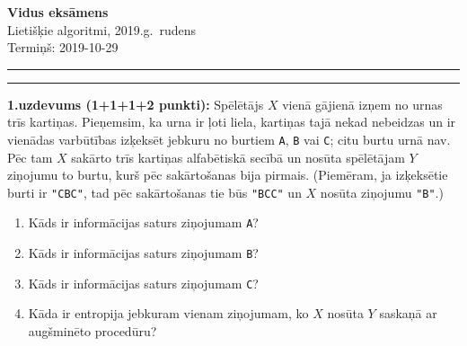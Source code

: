 \documentclass[a4paper,12pt]{article}
\begin{document}
\thispagestyle{empty}

\begin{center}
{\bf\Huge Vidus eksāmens} \\[5pt]
Lietišķie algoritmi, 2019.g.\ rudens\\
Termiņš: 2019-10-29
\end{center}

\hrule
\vspace{2pt}
\hrule
\vspace{12pt}





\noindent
{\bf 1.uzdevums (1+1+1+2 punkti):}
Spēlētājs $X$ vienā gājienā izņem no urnas trīs kartiņas. 
Pieņemsim, ka urna ir ļoti liela, kartiņas tajā nekad nebeidzas un ir vienādas varbūtības
izķeksēt jebkuru no burtiem {\tt A}, {\tt B} vai {\tt C}; citu burtu urnā nav.
Pēc tam $X$ sakārto trīs kartiņas alfabētiskā secībā un nosūta spēlētājam $Y$ ziņojumu \textendash{} to burtu, kurš 
pēc sakārtošanas bija pirmais. (Piemēram, ja izķeksētie burti ir {\tt "CBC"}, tad pēc sakārtošanas tie būs {\tt "BCC"} un 
$X$ nosūta ziņojumu {\tt "B"}.) 
\begin{enumerate}[label=(\alph*)]
\item Kāds ir informācijas saturs ziņojumam {\tt A}?
\item Kāds ir informācijas saturs ziņojumam {\tt B}? 
\item Kāds ir informācijas saturs ziņojumam {\tt C}? 
\item Kāda ir entropija jebkuram vienam ziņojumam, ko $X$ nosūta $Y$ saskaņā ar augšminēto procedūru?
\end{enumerate}
\end{document}
